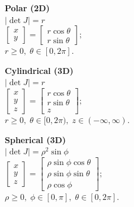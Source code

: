 \documentclass[8pt]{article}
\begin{document}
\begin{minipage}[t]{0.27\textwidth}
    \centering
  \noindent  \textbf{Polar (2D)} \\[4pt]
    \(|\det J| = r\) \\[4pt]
    \(\displaystyle
    \begin{bmatrix}
    x \\[4pt]
    y
    \end{bmatrix}
    =
    \begin{bmatrix}
    r\cos\theta \\[4pt]
    r\sin\theta
    \end{bmatrix};
    \) \\[4pt]
    \( r \geq 0, \; \theta \in [0, 2\pi] \).
\end{minipage}
\hfill
\begin{minipage}[t]{0.27\textwidth}
    \centering
    \textbf{Cylindrical (3D)} \\[4pt]
    \(|\det J| = r\) \\[4pt]
    \(\displaystyle
    \begin{bmatrix}
    x \\[4pt]
    y \\[4pt]
    z
    \end{bmatrix}
    =
    \begin{bmatrix}
    r\cos\theta \\[4pt]
    r\sin\theta \\[4pt]
    z
    \end{bmatrix};
    \) \\[4pt]
    \( r \geq 0, \; \theta \in [0, 2\pi), \; z \in (-\infty, \infty) \).
\end{minipage}
\hfill
\begin{minipage}[t]{0.37\textwidth}
    \centering
    \textbf{Spherical (3D)} \\[4pt]
    \(|\det J| = \rho^2\sin\phi\) \\[4pt]
    \(\displaystyle
    \begin{bmatrix}
    x \\[4pt]
    y \\[4pt]
    z
    \end{bmatrix}
    =
    \begin{bmatrix}
    \rho\sin\phi\cos\theta \\[4pt]
    \rho\sin\phi\sin\theta \\[4pt]
    \rho\cos\phi
    \end{bmatrix};
    \) \\[4pt]
    \( \rho \geq 0, \; \phi \in [0, \pi], \; \theta \in [0, 2\pi] \).
\end{minipage}
\end{document}

